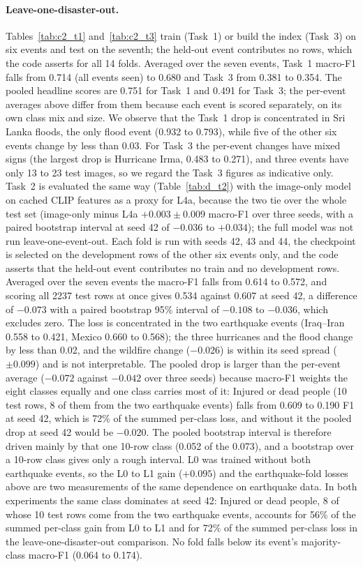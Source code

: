 \paragraph{Leave-one-disaster-out.}
Tables~\ref{tab:c2_t1} and~\ref{tab:c2_t3} train (Task~1) or build the index (Task~3) on six events and test on the seventh; the held-out event contributes no rows, which the code asserts for all 14 folds.
Averaged over the seven events, Task~1 macro-F1 falls from 0.714 (all events seen) to 0.680 and Task~3 from 0.381 to 0.354.
The pooled headline scores are 0.751 for Task~1 and 0.491 for Task~3; the per-event averages above differ from them because each event is scored separately, on its own class mix and size.
We observe that the Task~1 drop is concentrated in Sri Lanka floods, the only flood event (0.932 to 0.793), while five of the other six events change by less than 0.03.
For Task~3 the per-event changes have mixed signs (the largest drop is Hurricane Irma, 0.483 to 0.271), and three events have only 13 to 23 test images, so we regard the Task~3 figures as indicative only.
Task~2 is evaluated the same way (Table~\ref{tab:d_t2}) with the image-only model on cached CLIP features as a proxy for L4a, because the two tie over the whole test set (image-only minus L4a $+0.003 \pm 0.009$ macro-F1 over three seeds, with a paired bootstrap interval at seed 42 of $-0.036$ to $+0.034$); the full model was not run leave-one-event-out.
Each fold is run with seeds 42, 43 and 44, the checkpoint is selected on the development rows of the other six events only, and the code asserts that the held-out event contributes no train and no development rows.
Averaged over the seven events the macro-F1 falls from 0.614 to 0.572, and scoring all 2237 test rows at once gives 0.534 against 0.607 at seed 42, a difference of $-0.073$ with a paired bootstrap 95\% interval of $-0.108$ to $-0.036$, which excludes zero.
The loss is concentrated in the two earthquake events (Iraq--Iran 0.558 to 0.421, Mexico 0.660 to 0.568); the three hurricanes and the flood change by less than 0.02, and the wildfire change ($-0.026$) is within its seed spread ($\pm 0.099$) and is not interpretable.
The pooled drop is larger than the per-event average ($-0.072$ against $-0.042$ over three seeds) because macro-F1 weights the eight classes equally and one class carries most of it: Injured or dead people (10 test rows, 8 of them from the two earthquake events) falls from 0.609 to 0.190 F1 at seed 42, which is 72\% of the summed per-class loss, and without it the pooled drop at seed 42 would be $-0.020$.
The pooled bootstrap interval is therefore driven mainly by that one 10-row class (0.052 of the 0.073), and a bootstrap over a 10-row class gives only a rough interval.
L0 was trained without both earthquake events, so the L0 to L1 gain ($+0.095$) and the earthquake-fold losses above are two measurements of the same dependence on earthquake data.
In both experiments the same class dominates at seed 42: Injured or dead people, 8 of whose 10 test rows come from the two earthquake events, accounts for 56\% of the summed per-class gain from L0 to L1 and for 72\% of the summed per-class loss in the leave-one-disaster-out comparison.
No fold falls below its event's majority-class macro-F1 (0.064 to 0.174).

